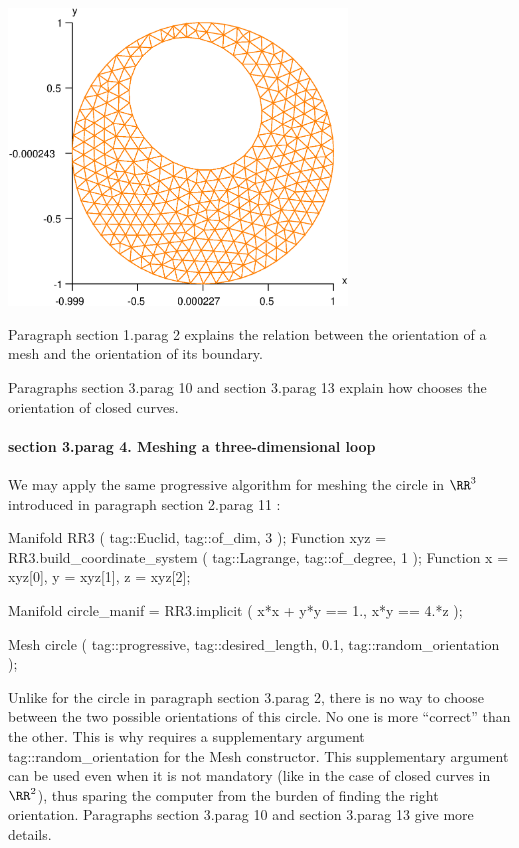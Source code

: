 \centerline{\includegraphics[width=90mm]{disk-with-hole.eps}}

Paragraph \numb section 1.\numb parag 2 explains the relation between the orientation of
a mesh and the orientation of its boundary.

Paragraphs \numb section 3.\numb parag 10 and \numb section 3.\numb parag 13 explain how
{\maniFEM} chooses the orientation of closed curves.


\vskip 5mm
\paragraph{\numb section 3.\numb parag 4. Meshing a three-dimensional loop}

We may apply the same {\codett progressive} algorithm for meshing the circle in $ \RR^3 $
introduced in paragraph \numb section 2.\numb parag 11 :

\verbatim
   Manifold RR3 ( tag::Euclid, tag::of_dim, 3 );
   Function xyz = RR3.build_coordinate_system ( tag::Lagrange, tag::of_degree, 1 );
   Function x = xyz[0],  y = xyz[1],  z = xyz[2];

   Manifold circle_manif = RR3.implicit ( x*x + y*y == 1., x*y == 4.*z );
   
   Mesh circle
      ( tag::progressive, tag::desired_length, 0.1, tag::random_orientation );
\endverbatim

Unlike for the {\codett circle} in paragraph \numb section 3.\numb parag 2, there is no way
to choose between the two possible orientations of this {\codett circle}.
No one is more ``correct'' than the other.
This is why {\maniFEM} requires a supplementary argument {\codett tag::random\_orientation}
for the {\codett Mesh} constructor.
This supplementary argument can be used even when it is not mandatory (like in the case of
closed curves in $ \RR^2 $), thus sparing the computer from the burden of finding
the right orientation.
Paragraphs \numb section 3.\numb parag 10 and \numb section 3.\numb parag 13 give more details.

